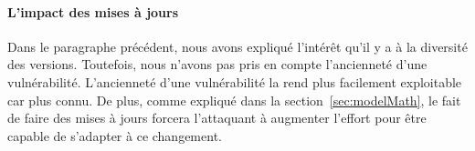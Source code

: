 \paragraph{L'impact des mises à jours}
Dans le paragraphe précédent, nous avons expliqué l'intérêt qu'il y a à la diversité des versions.
Toutefois, nous n'avons pas pris en compte l'ancienneté d'une vulnérabilité. 
L'ancienneté d'une vulnérabilité la rend plus facilement exploitable car plus connu.
De plus, comme expliqué dans la section~\ref{sec:modelMath}, le fait de faire des mises à jours forcera l'attaquant à augmenter l'effort pour être capable de s'adapter à ce changement.